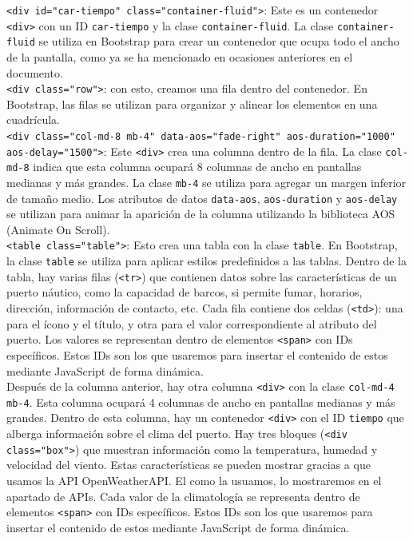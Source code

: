 \documentclass{article}
\begin{document}
\noindent\texttt{<div id="car-tiempo" class="container-fluid">}: Este es un contenedor \texttt{<div>} con un ID \texttt{car-tiempo} y la clase \texttt{container-fluid}. La clase \texttt{container-fluid} se utiliza en Bootstrap para crear un contenedor que ocupa todo el ancho de la pantalla, como ya se ha mencionado en ocasiones anteriores en el documento.\\

\noindent\texttt{<div class="row">}: con esto, creamos una fila dentro del contenedor. En Bootstrap, las filas se utilizan para organizar y alinear los elementos en una cuadrícula.\\

\noindent\texttt{<div class="col-md-8 mb-4" data-aos="fade-right" aos-duration="1000" aos-delay="1500">}: Este \texttt{<div>} crea una columna dentro de la fila. La clase \texttt{col-md-8} indica que esta columna ocupará 8 columnas de ancho en pantallas medianas y más grandes. La clase \texttt{mb-4} se utiliza para agregar un margen inferior de tamaño medio. Los atributos de datos \texttt{data-aos}, \texttt{aos-duration} y \texttt{aos-delay} se utilizan para animar la aparición de la columna utilizando la biblioteca AOS (Animate On Scroll).\\

\noindent\texttt{<table class="table">}: Esto crea una tabla con la clase \texttt{table}. En Bootstrap, la clase \texttt{table} se utiliza para aplicar estilos predefinidos a las tablas. Dentro de la tabla, hay varias filas (\texttt{<tr>}) que contienen datos sobre las características de un puerto náutico, como la capacidad de barcos, si permite fumar, horarios, dirección, información de contacto, etc. Cada fila contiene dos celdas (\texttt{<td>}): una para el ícono y el título, y otra para el valor correspondiente al atributo del puerto. Los valores se representan dentro de elementos \texttt{<span>} con IDs específicos. Estos IDs son los que usaremos para insertar el contenido de estos mediante JavaScript de forma dinámica.\\

\noindent Después de la columna anterior, hay otra columna \texttt{<div>} con la clase \texttt{col-md-4 mb-4}. Esta columna ocupará 4 columnas de ancho en pantallas medianas y más grandes. Dentro de esta columna, hay un contenedor \texttt{<div>} con el ID \texttt{tiempo} que alberga información sobre el clima del puerto. Hay tres bloques (\texttt{<div class="box">}) que muestran información como la temperatura, humedad y velocidad del viento. Estas características se pueden mostrar gracias a que usamos la API OpenWeatherAPI. El como la usuamos, lo mostraremos en el apartado de APIs. Cada valor de la climatología se representa dentro de elementos \texttt{<span>} con IDs específicos. Estos IDs son los que usaremos para insertar el contenido de estos mediante JavaScript de forma dinámica.\\
\end{document}
